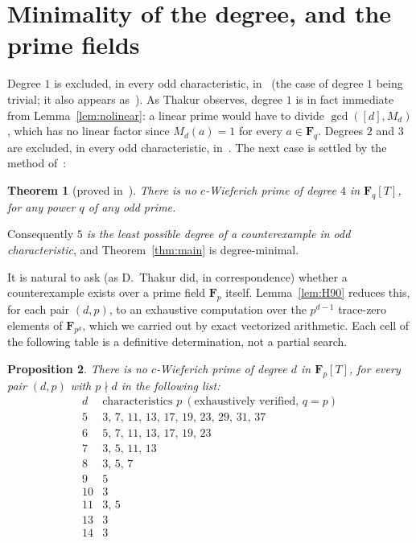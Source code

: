 \documentclass[10pt,a4paper]{amsart}
\newcommand{\F}{\mathbf{F}}
\newtheorem{theorem}{Theorem}[section]
\newtheorem{proposition}[theorem]{Proposition}
\begin{document}
\section{Minimality of the degree, and the prime fields}\label{sec:grid}

Degree $1$ is excluded, in every odd characteristic, in~\cite{Tha15} (the case
of degree $1$ being trivial; it also appears as~\cite[Cor.~4.5]{Bam17}). As
Thakur observes, degree $1$ is in fact immediate from
Lemma~\ref{lem:nolinear}: a linear prime would have to divide $\gcd([d],M_d)$,
which has no linear factor since $M_d(a)=1$ for every $a\in\F_q$. Degrees $2$
and $3$ are excluded, in every odd characteristic, in~\cite{Tha15}. The next
case is settled by the method of~\cite{NG2}:

\begin{theorem}[proved in~\cite{NG2}]\label{thm:deg4}
There is no $c$-Wieferich prime of degree $4$ in $\F_q[T]$, for any power $q$ of
any odd prime.
\end{theorem}

Consequently \emph{$5$ is the least possible degree of a counterexample in odd
characteristic}, and Theorem~\ref{thm:main} is degree-minimal.

It is natural to ask (as D.~Thakur did, in correspondence) whether a
counterexample exists over a prime field $\F_p$ itself. Lemma~\ref{lem:H90}
reduces this, for each pair $(d,p)$, to an exhaustive computation over the
$p^{d-1}$ trace-zero elements of $\F_{p^d}$, which we carried out by exact
vectorized arithmetic. Each cell of the following table is a definitive
determination, not a partial search.

\begin{proposition}\label{prop:grid}
There is no $c$-Wieferich prime of degree $d$ in $\F_p[T]$, for every pair
$(d,p)$ with $p\nmid d$ in the following list:
\[
\begin{array}{c|l}
d & \text{characteristics }p\ (\text{exhaustively verified, }q=p)\\\hline
5 & 3,\,7,\,11,\,13,\,17,\,19,\,23,\,29,\,31,\,37\\
6 & 5,\,7,\,11,\,13,\,17,\,19,\,23\\
7 & 3,\,5,\,11,\,13\\
8 & 3,\,5,\,7\\
9 & 5\\
10 & 3\\
11 & 3,\,5\\
13 & 3\\
14 & 3
\end{array}
\]
\end{proposition}
\end{document}

